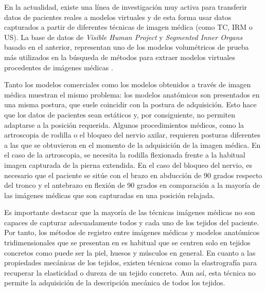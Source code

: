 En la actualidad, existe una línea de investigación muy activa para transferir datos de pacientes reales a modelos virtuales y de esta forma usar datos capturados a partir de diferentes técnicas de imagen médica (como \ac{TC}, \ac{IRM} o \ac{US}). La base de datos de  \emph{Visible Human Project} \cite{ackerman1998visible} y  \emph{Segmented Inner Organs} \cite{VoxelMan} basado en el anterior, representan uno de los modelos volumétricos de prueba más utilizados en la búsqueda de métodos para extraer modelos virtuales procedentes de imágenes médicas \cite{ferrante2017slice}.

Tanto los modelos comerciales como los modelos obtenidos a través de imagen médica muestran el mismo problema: los modelos anatómicos son presentados en una misma postura, que suele coincidir con la postura de adquisición. Esto hace que los datos de pacientes sean estáticos y, por consiguiente, no permiten adaptarse a la posición requerida. Algunos procedimientos médicos, como la artroscopia de rodilla o el bloqueo del nervio axilar, requieren posturas diferentes a las que se obtuvieron en el momento de la adquisición de la imagen médica. En el caso de la artroscopia, se necesita la rodilla flexionada frente a la habitual imagen capturada de la pierna extendida. En el caso del bloqueo del nervio, es necesario que el paciente se sitúe con el brazo en abducción de 90 grados respecto del tronco y el antebrazo en flexión de 90 grados en comparación a la mayoría de las imágenes médicas que son capturadas en una posición relajada. 

Es importante destacar que la mayoría de las técnicas imágenes médicas no son capaces de capturar adecuadamente todos y cada uno de los tejidos del paciente. Por tanto, los métodos de registro entre imágenes médicas y modelos anatómicos tridimensionales que se presentan en \cite{ferrante2017slice} es habitual que se centren solo en tejidos concretos como puede ser la piel, huesos y músculos en general. 
En cuanto a las propiedades mecánicas de los tejidos, existen técnicas como la elastrografía \cite{MRIelastography} para recuperar la elasticidad o dureza de un tejido concreto. Aun así, esta técnica no permite la adquisición de la descripción mecánica de todos los tejidos.




